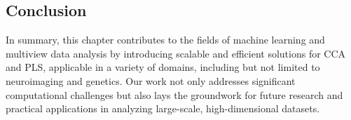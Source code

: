 




\subsection{Conclusion}

In summary, this chapter contributes to the fields of machine learning and multiview data analysis by introducing scalable and efficient solutions for CCA and PLS, applicable in a variety of domains, including but not limited to neuroimaging and genetics.
Our work not only addresses significant computational challenges but also lays the groundwork for future research and practical applications in analyzing large-scale, high-dimensional datasets.